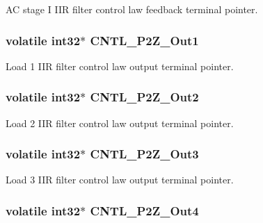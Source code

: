 A\-C stage I I\-I\-R filter control law feedback terminal pointer. \hypertarget{a00014_a84d7c096ca668d1edc5e4fa54abe5d98}{
\subsubsection[{C\-N\-T\-L\-\_\-2\-P2\-Z\-\_\-\-Out1}]{\setlength{\rightskip}{0pt plus 5cm}volatile int32$\ast$ C\-N\-T\-L\-\_\-P2\-Z\-\_\-\-Out1}}\label{a00014_a84d7c096ca668d1edc5e4fa54abe5d98}
Load 1 I\-I\-R filter control law output terminal pointer. \hypertarget{a00014_ae6679b66ffeca93742f973a2c947855f}{
\subsubsection[{C\-N\-T\-L\-\_\-2\-P2\-Z\-\_\-\-Out2}]{\setlength{\rightskip}{0pt plus 5cm}volatile int32$\ast$ C\-N\-T\-L\-\_\-P2\-Z\-\_\-\-Out2}}\label{a00014_ae6679b66ffeca93742f973a2c947855f}
Load 2 I\-I\-R filter control law output terminal pointer. \hypertarget{a00014_a11dcb9f6b6d03fe960ddf790e1ad5ed2}{
\subsubsection[{C\-N\-T\-L\-\_\-2\-P2\-Z\-\_\-\-Out3}]{\setlength{\rightskip}{0pt plus 5cm}volatile int32$\ast$ C\-N\-T\-L\-\_\-P2\-Z\-\_\-\-Out3}}\label{a00014_a11dcb9f6b6d03fe960ddf790e1ad5ed2}
Load 3 I\-I\-R filter control law output terminal pointer. \hypertarget{a00014_a253e4070b19470606e0566ff25fc911f}{
\subsubsection[{C\-N\-T\-L\-\_\-2\-P2\-Z\-\_\-\-Out4}]{\setlength{\rightskip}{0pt plus 5cm}volatile int32$\ast$ C\-N\-T\-L\-\_\-P2\-Z\-\_\-\-Out4}}\label{a00014_a253e4070b19470606e0566ff25fc911f}

